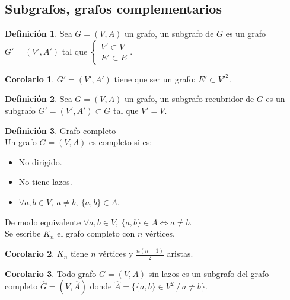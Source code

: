 \documentclass[10pt]{article}
\theoremstyle{definition}
\newtheorem{definition}{Definición}[section]
\newtheorem{corollary}{Corolario}[theorem]
\begin{document}
    \subsection{Subgrafos, grafos complementarios}
    \begin{definition}
        Sea $G=(V,A)$ un grafo, un subgrafo de $G$ es un grafo $G'=(V',A')$ tal que $\begin{cases}V'\subset V\\E'\subset E\end{cases}$.
    \end{definition}
    \begin{corollary}
        $G'=(V',A')$ tiene que ser un grafo: $E'\subset V'^2$.
    \end{corollary}
    \begin{definition}
        Sea $G=(V,A)$ un grafo, un subgrafo recubridor de $G$ es un subgrafo $G'=(V',A')\subset G$ tal que $V'=V$.
    \end{definition}
    \begin{definition}{Grafo completo}
        \\Un grafo $G=(V,A)$ es completo si es:
        \begin{itemize}
            \item No dirigido.
            \item No tiene lazos.
            \item $\forall a,b\in V,\ a\neq b,\ \{a,b\}\in A$.
        \end{itemize}
        De modo equivalente $\forall a,b\in V,\ \{a,b\}\in A\Leftrightarrow a\neq b$.\\
        Se escribe $K_n$ el grafo completo con $n$ vértices.
    \end{definition}
    \begin{corollary}
        $K_n$ tiene $n$ vértices y $\frac{n(n-1)}{2}$ aristas.
    \end{corollary}
    \begin{corollary}
        Todo grafo $G=(V,A)$ sin lazos es un subgrafo del grafo completo $\hat{G}=(V,\hat{A})$ donde $\hat{A}=\{\{a,b\}\in V^2\ /\ a\neq b\}$.
    \end{corollary}
\end{document}
